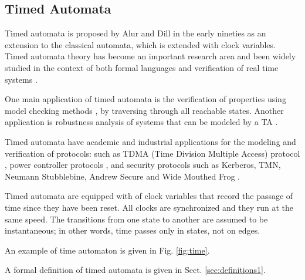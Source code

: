 \documentclass [a4paper, 12pt, twoside]{report}
\theoremstyle{plain}
\theoremstyle{definition}
\theoremstyle{remark}
\theoremstyle{plain}
\theoremstyle{plain}
\theoremstyle{remark}
\begin{document}
\subsection{Timed Automata}

Timed automata is proposed by Alur and Dill \cite{AD94} in the early nineties as an extension to the classical automata, which is extended with clock variables. 
Timed automata theory has become an important research area and been widely studied in the context of both formal languages and verification of real time systems \cite{5521565}.

One main application of timed automata is the verification of properties using model checking methods \cite{clarke_model_checking}, by traversing through all reachable states.
Another application is robustness analysis of systems that can be modeled by a TA \cite{markey2011robustness}.

Timed automata have academic and industrial applications for the modeling and verification of protocols: such as TDMA (Time Division Multiple Access) protocol \cite{tdma}, power controller protocols \cite{havelund_power_controller_1999}, and security protocols such as Kerberos, TMN, Neumann Stubblebine, Andrew Secure and Wide Mouthed Frog \cite{jakubowska2005verifying,jakubowska2007modelling}.

Timed automata are equipped with of clock variables that record the passage of time since they have been reset. All clocks are synchronized and they run at the same speed. 
The transitions from one state to another are assumed to be instantaneous; in other words, time passes only in states, not on edges.

An example of time automaton is given in Fig. \ref{fig:time}.

A formal definition of timed automata is given in Sect. \ref{sec:definitions1}.
\end{document}
